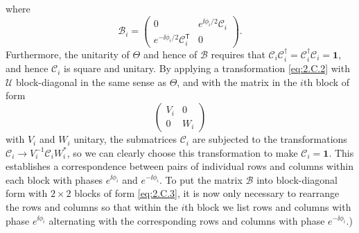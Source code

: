 where
\begin{equation}
  \mathcal{B}_i=
  \begin{pmatrix}
    0 & e^{\ii\phi_i/2}\mathcal{C}_i \\
    e^{-\ii\phi_i/2}\mathcal{C}_i^{\mathsf T} & 0
  \end{pmatrix}.
  \tag{2.C.7}\label{eq:2.C.7}
\end{equation}
Furthermore, the unitarity of $\Theta$ and hence of $\mathcal{B}$
requires that
$\mathcal{C}_i\mathcal{C}_i^\dagger=
\mathcal{C}_i^\dagger\mathcal{C}_i=\mathbf{1}$, and hence $\mathcal{C}_i$ is
square and unitary. By applying a transformation \eqref{eq:2.C.2} with
$\mathcal{U}$ block-diagonal in the same sense as $\Theta$, and with
the matrix in the $i$th block of form
\begin{equation*}
  \begin{pmatrix}
    V_i & 0 \\
    0 & W_i
  \end{pmatrix}
\end{equation*}
with $V_i$ and $W_i$ unitary, the submatrices $\mathcal{C}_i$ are subjected
to the transformations
$\mathcal{C}_i\longrightarrow V_i^{-1}\mathcal{C}_iW_i^*$, so we can
clearly choose this transformation to make $\mathcal{C}_i=\mathbf{1}$. This
establishes a correspondence between pairs of individual rows and columns
within each block with phases $e^{\ii\phi_i}$ and $e^{-\ii\phi_i}$. To put the
matrix $\mathcal{B}$ into block-diagonal form with $2\times2$ blocks of form
\eqref{eq:2.C.3}, it is now only necessary to rearrange the rows and columns so that
within the $i$th block we list rows and columns with phase $e^{\ii\phi_i}$
alternating with the corresponding rows and columns with phase
$e^{-\ii\phi_i}$.)

